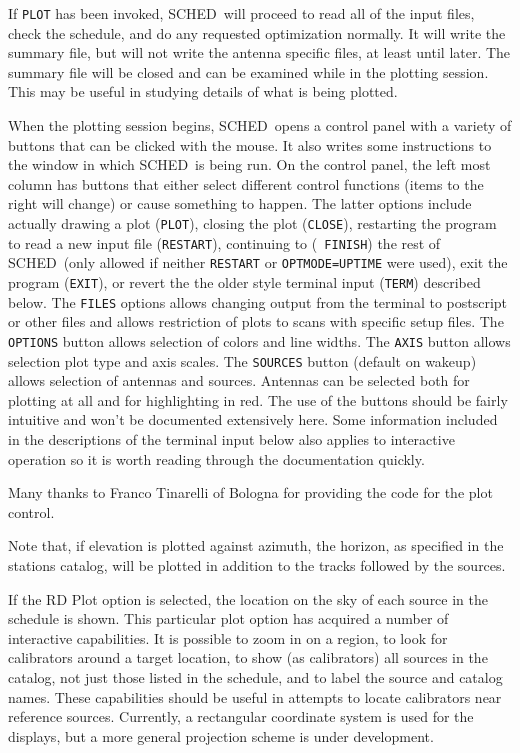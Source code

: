 \documentclass{report}
\newcommand{\schedb}{{\sc SCHED~}}
\begin{document}
If {\tt PLOT} has been invoked, \schedb will proceed to read all of
the input files, check the schedule, and do any requested optimization
normally.  It will write the summary file, but will not write the
antenna specific files, at least until later.  The summary file will
be closed and can be examined while in the plotting session.  This may
be useful in studying details of what is being plotted.

When the plotting session begins, \schedb opens a control panel with a
variety of buttons that can be clicked with the mouse.  It also writes
some instructions to the window in which \schedb is being run.  On the
control panel, the left most column has buttons that either select
different control functions (items to the right will change) or cause
something to happen.  The latter options include actually drawing a
plot ({\tt PLOT}), closing the plot ({\tt CLOSE}), restarting the
program to read a new input file ({\tt RESTART}), continuing to ({\tt
FINISH}) the rest of \schedb (only allowed if neither {\tt RESTART} or
{\tt OPTMODE=UPTIME} were used), exit the program ({\tt EXIT}), or
revert the the older style terminal input ({\tt TERM}) described
below.  The {\tt FILES} options allows changing output from the
terminal to postscript or other files and allows restriction of plots
to scans with specific setup files.  The {\tt OPTIONS} button allows
selection of colors and line widths.  The {\tt AXIS} button allows
selection plot type and axis scales.  The {\tt SOURCES} button
(default on wakeup) allows selection of antennas and sources.
Antennas can be selected both for plotting at all and for highlighting
in red.  The use of the buttons should be fairly intuitive and won't
be documented extensively here.  Some information included in the
descriptions of the terminal input below also applies to interactive
operation so it is worth reading through the documentation quickly.

Many thanks to Franco Tinarelli of Bologna for providing the code
for the plot control.

Note that, if elevation is plotted against azimuth, the horizon, as
specified in the stations catalog, will be plotted in addition to the
tracks followed by the sources.

If the RD Plot option is selected, the location on the sky of each
source in the schedule is shown.  This particular plot option has
acquired a number of interactive capabilities.  It is possible to
zoom in on a region, to look for calibrators around a target location,
to show (as calibrators) all sources in the catalog, not just those
listed in the schedule, and to label the source and catalog names.
These capabilities should be useful in attempts to locate calibrators
near reference sources.  Currently, a rectangular coordinate system
is used for the displays, but a more general projection scheme is
under development.
\end{document}
